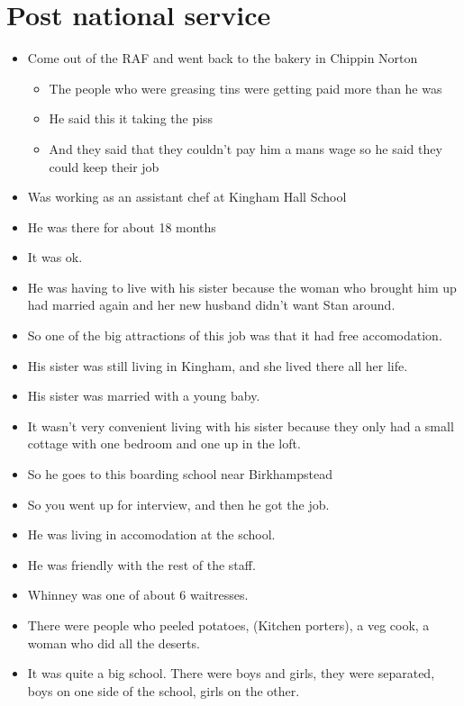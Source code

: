 \documentclass[10pt,twocolumn,letterpaper]{article}
\begin{document}
\section{Post national service}
\begin{itemize}
    \item Come out of the RAF and went back to the bakery in Chippin Norton
          \begin{itemize}
              \item The people who were greasing tins were getting paid more than he was
              \item He said this it taking the piss
              \item And they said that they couldn't pay him a mans wage so he said they could keep their job
          \end{itemize}
    \item Was working as an assistant chef at Kingham Hall School
    \item He was there for about 18 months
    \item It was ok.
    \item He was having to live with his sister because the woman who brought him up had married again and her new husband didn't want Stan around.
    \item So one of the big attractions of this job was that it had free accomodation.
    \item His sister was still living in Kingham, and she lived there all her life.
    \item His sister was married with a young baby.
    \item It wasn't very convenient living with his sister because they only had a small cottage with one bedroom and one up in the loft.
    \item So he goes to this boarding school near Birkhampstead
    \item So you went up for interview, and then he got the job.
    \item He was living in accomodation at the school.
    \item He was friendly with the rest of the staff.
    \item Whinney was one of about 6 waitresses.
    \item There were people who peeled potatoes, (Kitchen porters), a veg cook, a woman who did all the deserts.
    \item It was quite a big school. There were boys and girls, they were separated, boys on one side of the school, girls on the other.

\end{itemize}
\end{document}
